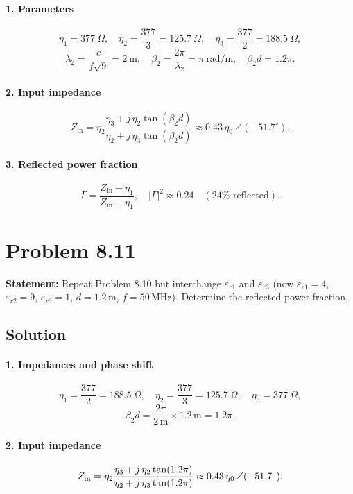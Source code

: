 \paragraph{1. Parameters}
\[
\eta_1 = 377\ \Omega,\quad
\eta_2 = \frac{377}{3} = 125.7\ \Omega,\quad
\eta_3 = \frac{377}{2} = 188.5\ \Omega,
\]
\[
\lambda_2 = \frac{c}{f\sqrt{9}} = 2\ \mathrm{m},
\quad
\beta_2 = \frac{2\pi}{\lambda_2} = \pi\ \mathrm{rad/m},
\quad
\beta_2 d = 1.2\pi.
\]

\paragraph{2. Input impedance}
\[
Z_{\mathrm{in}}
= \eta_2
  \frac{\eta_3 + j\,\eta_2\tan(\beta_2 d)}
       {\eta_2 + j\,\eta_3\tan(\beta_2 d)}
\approx 0.43\,\eta_0\,\angle(-51.7^\circ).
\]

\paragraph{3. Reflected power fraction}
\[
\Gamma = \frac{Z_{\mathrm{in}} - \eta_1}{Z_{\mathrm{in}} + \eta_1},
\quad
|\Gamma|^2 \approx 0.24
\quad(24\%\text{ reflected}).
\]


\section*{Problem 8.11}
\textbf{Statement:} Repeat Problem 8.10 but interchange $\varepsilon_{r1}$ and $\varepsilon_{r3}$ (now $\varepsilon_{r1}=4$, $\varepsilon_{r2}=9$, $\varepsilon_{r3}=1$, $d=1.2\,$m, $f=50\,$MHz). Determine the reflected power fraction.

\subsection*{Solution}
\paragraph{1. Impedances and phase shift}
\[
\eta_1 = \frac{377}{2} = 188.5\ \Omega,\quad
\eta_2 = \frac{377}{3} = 125.7\ \Omega,\quad
\eta_3 = 377\ \Omega,
\]
\[
\beta_2 d = \frac{2\pi}{2\,\mathrm m}\times1.2\,\mathrm m = 1.2\pi.
\]

\paragraph{2. Input impedance}
\[
Z_{\rm in}
= \eta_2
  \frac{\eta_3 + j\,\eta_2\tan(1.2\pi)}
       {\eta_2 + j\,\eta_3\tan(1.2\pi)}
\approx 0.43\,\eta_0\,\angle(-51.7^\circ).
\]

